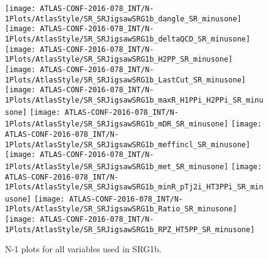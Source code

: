 \begin{figure}[tbp]
\begin{center}

\texttt{[image: ATLAS-CONF-2016-078\_INT/N-1Plots/AtlasStyle/SR\_SRJigsawSRG1b\_dangle\_SR\_minusone]}
\texttt{[image: ATLAS-CONF-2016-078\_INT/N-1Plots/AtlasStyle/SR\_SRJigsawSRG1b\_deltaQCD\_SR\_minusone]}
\texttt{[image: ATLAS-CONF-2016-078\_INT/N-1Plots/AtlasStyle/SR\_SRJigsawSRG1b\_H2PP\_SR\_minusone]}
\texttt{[image: ATLAS-CONF-2016-078\_INT/N-1Plots/AtlasStyle/SR\_SRJigsawSRG1b\_LastCut\_SR\_minusone]}
\texttt{[image: ATLAS-CONF-2016-078\_INT/N-1Plots/AtlasStyle/SR\_SRJigsawSRG1b\_maxR\_H1PPi\_H2PPi\_SR\_minusone]}
\texttt{[image: ATLAS-CONF-2016-078\_INT/N-1Plots/AtlasStyle/SR\_SRJigsawSRG1b\_mDR\_SR\_minusone]}
\texttt{[image: ATLAS-CONF-2016-078\_INT/N-1Plots/AtlasStyle/SR\_SRJigsawSRG1b\_meffincl\_SR\_minusone]}
\texttt{[image: ATLAS-CONF-2016-078\_INT/N-1Plots/AtlasStyle/SR\_SRJigsawSRG1b\_met\_SR\_minusone]}
\texttt{[image: ATLAS-CONF-2016-078\_INT/N-1Plots/AtlasStyle/SR\_SRJigsawSRG1b\_minR\_pTj2i\_HT3PPi\_SR\_minusone]}
\texttt{[image: ATLAS-CONF-2016-078\_INT/N-1Plots/AtlasStyle/SR\_SRJigsawSRG1b\_Ratio\_SR\_minusone]}
\texttt{[image: ATLAS-CONF-2016-078\_INT/N-1Plots/AtlasStyle/SR\_SRJigsawSRG1b\_RPZ\_HT5PP\_SR\_minusone]}
\end{center}
\caption{N-1 plots for all variables used in SRG1b.}
\label{fig:SR_SRJigsawSRG1b_mDR_SR_minusone}
\end{figure}

